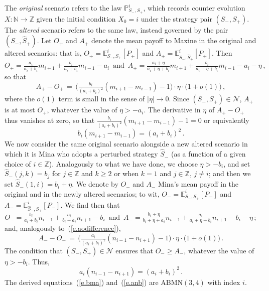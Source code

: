 \documentclass[letterpaper,11pt,oneside,reqno]{amsbook}
\newcommand{\PP}{\ensuremath{\mathbb{P}}}
\newcommand{\N}{\ensuremath{\mathbb{N}}}
\newcommand{\Z}{\ensuremath{\mathbb{Z}}}
\newcommand{\E}[0]{\mathbb{E}}
\numberwithin{figure}{chapter}
\theoremstyle{definition}
\theoremstyle{definition}
\theoremstyle{definition}
\theoremstyle{definition}
\theoremstyle{definition}
\newcommand{\mc}{\mathcal}
\newcommand{\nwithzero}{\N}
\newcommand\pgameplay[3]{\PP^{#3}_{#1,#2}}
\newcommand\egameplay[3]{\E^{#3}_{#1,#2}}
\newcommand{\abmnmac}{\textrm{ABMN}}
\begin{document}
The {\em original} scenario refers to the law $\pgameplay{S_-}{S_+}{i}$, which records counter evolution~$X:\nwithzero \to \Z$ given the initial condition $X_0 = i$ under the strategy pair $(S_-,S_+)$. The {\em altered} scenario refers to the same law, instead governed by the pair $(S_-,\hat{S}_+)$. Let $O_+$ and $A_+$ denote the mean payoff to Maxine in the original and altered scenarios: that is, $O_+ = \egameplay{S_-}{S_+}{i} [P_+]$ and $A_+ = \egameplay{S_-}{\hat{S}_+}{i} [P_+]$.    
Then
$$
 O_+ = \tfrac{a_i}{a_i+b_i} m_{i+1} + \tfrac{b_i}{a_i+b_i} m_{i-1} - a_i \, \, \, \textrm{and} \, \, \, A_+ = \tfrac{a_i+\eta}{a_i+\eta+ b_i} m_{i+1} + \tfrac{b_i}{a_i+\eta+b_i} m_{i-1} - a_i - \eta \, ,
$$
so that
\begin{equation}\label{e.aodifference}
A_+ - O_+ \, = \, \Big( \tfrac{b_i}{(a_i+b_i)^2} (m_{i+1} - m_{i-1})  - 1 \Big) \cdot \eta \cdot \big( 1 + o(1) \big) \, ,
\end{equation}
where the $o(1)$ term is small in the sense of $\vert \eta \vert \to 0$.
Since $(S_-,S_+) \in \mc{N}$, $A_+$ is at most $O_+$, whatever the value of $\eta > - a_i$. The derivative in $\eta$ of $A_+ - O_+$ thus vanishes at zero, so that 
$\tfrac{b_i}{(a_i+b_i)^2} (m_{i+1} - m_{i-1})  - 1 = 0$
or equivalently
\begin{equation}\label{e.bma}
  b_i  (m_{i+1} - m_{i-1})   = (a_i+b_i)^2 \, .
\end{equation}
We now consider the same original scenario alongside a new altered scenario in which it is Mina who adopts a perturbed strategy $\hat{S}_-$ (as a function of a given choice of $i \in \Z$). Analogously to what we have done, we choose $\eta > - b_i$,
and set $\hat{S}_-(j,k) = b_j$ for  $j \in \Z$ and $k \geq 2$  or when $k=1$ and $j \in \Z$, $j\not=i$; and then we set $\hat{S}_-(1,i) = b_i + \eta$. 
We denote by  $O_-$ and $A_-$ Mina's mean payoff in the original and in the newly altered scenarios; to wit,  $O_- = \egameplay{S_-}{S_+}{i} [P_-]$ and $A_- =  \egameplay{\hat{S}_-}{S_+}{i} [P_-]$.
We find then that
$$
 O_- = \tfrac{b_i}{a_i+b_i} n_{i-1} + \tfrac{a_i}{b_i+a_i} n_{i+1} - b_i \, \, \, \textrm{and} \, \, \, A_- = \tfrac{b_i+\eta}{b_i+\eta+ a_i} n_{i-1} + \tfrac{a_i}{a_i+\eta+b_i} n_{i+1} - b_i - \eta \, ;
$$
and, analogously to~(\ref{e.aodifference}),
$$
A_- - O_- \, = \, \Big( \tfrac{a_i}{(a_i+b_i)^2} (n_{i-1} -n_{i+1})  - 1 \Big) \cdot \eta \cdot \big( 1 + o(1) \big) \, .
$$
The condition that $(S_-,S_+) \in \mc{N}$ ensures that $O_- \geq A_-$, whatever the value of $\eta > - b_i$. Thus,
\begin{equation}\label{e.anb}
 a_i  (n_{i-1} - n_{i+1})   = (a_i+b_i)^2 \, .
\end{equation}
The derived equations~(\ref{e.bma}) and~(\ref{e.anb}) are \abmnmac$(3,4)$ with index $i$. 
\end{document}
